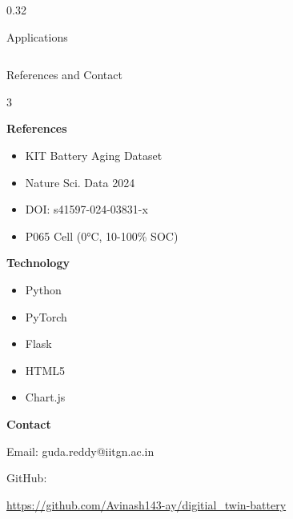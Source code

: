 \documentclass[final]{beamer}
\begin{document}
\begin{frame}[t]
\begin{columns}[t]
\begin{column}{0.32\textwidth}
\begin{block}{Applications}
\end{block}

\end{column}

\end{columns}

\vspace{1cm}


\begin{block}{References and Contact}

\begin{multicols}{3}

\textbf{References}

\begin{itemize}
\item KIT Battery Aging Dataset
\item Nature Sci. Data 2024
\item DOI: s41597-024-03831-x
\item P065 Cell (0°C, 10-100\% SOC)
\end{itemize}

\columnbreak

\textbf{Technology}

\begin{itemize}
\item Python
\item PyTorch
\item Flask
\item HTML5
\item Chart.js
\end{itemize}

\columnbreak

\textbf{Contact}

Email: guda.reddy@iitgn.ac.in

GitHub:

\url{https://github.com/Avinash143-ay/digitial_twin-battery}

\begin{center}
\end{center}

\end{multicols}

\end{block}

\end{frame}
\end{document}
